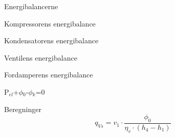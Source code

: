 \documentclass[Hovedrapport.tex]{article}
\begin{document}
\vspace{0.10in}
\noindent
\rm Energibalancerne

\vspace{0.10in}
\noindent
\rm Kompressorens energibalance

\vspace{0.10in}
\noindent
\rm Kondensatorens energibalance

\vspace{0.10in}
\noindent
\rm Ventilens energibalance

\vspace{0.10in}
\noindent
\rm Fordamperens energibalance

\vspace{0.10in}
\noindent
\rm P$_{el}$+$\phi$$_{0}$-$\phi$$_{k}$=0

\vspace{0.10in}
\noindent
\rm Beregninger
\begin{equation}
\label{EES Eqn:10}
q_{Vs}=v_{1}\cdot \frac {\phi_{0}}{ \eta_{v}\cdot  \left( h_{4}-h_{1} \right)  } 
\end{equation}
\end{document}
